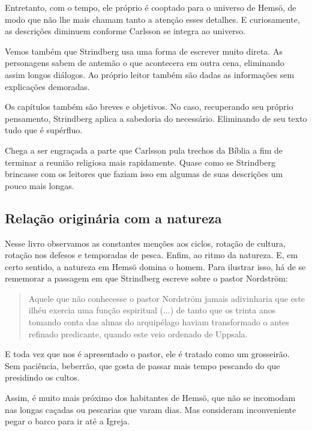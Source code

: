 \documentclass[12pt]{extarticle}
\begin{document}
Entretanto, com o tempo, ele próprio é cooptado para o universo de
Hemsö, de modo que não lhe mais chamam tanto a atenção esses detalhes. E
curiosamente, as descrições diminuem conforme Carlsson se integra ao
universo.

Vemos também que Strindberg usa uma forma de escrever muito direta. As
personagens sabem de antemão o que acontecera em outra cena, eliminando
assim longos diálogos. Ao próprio leitor também são dadas as informações
sem explicações demoradas.

Os capítulos também são breves e objetivos. No caso, recuperando seu
próprio pensamento, Strindberg aplica a sabedoria do necessário.
Eliminando de seu texto tudo que é supérfluo.

Chega a ser engraçada a parte que Carlsson pula trechos da Bíblia a fim
de terminar a reunião religiosa mais rapidamente. Quase como se
Strindberg brincasse com os leitores que faziam isso em algumas de suas
descrições um pouco mais longas.

\subsection{Relação originária com a natureza}

Nesse livro observamos as constantes menções aos ciclos, rotação de
cultura, rotação nos defesos e temporadas de pesca. Enfim, ao ritmo da
natureza. E, em certo sentido, a natureza em Hemsö domina o homem. Para
ilustrar isso, há de se rememorar a passagem em que Strindberg escreve
sobre o pastor Nordström:

\begin{quote}
Aquele que não conhecesse o pastor Nordström jamais adivinharia que este
ilhéu exercia uma função espiritual (...) de tanto que os trinta anos
tomando conta das almas do arquipélago haviam transformado o antes
refinado predicante, quando este veio ordenado de Uppsala.
\end{quote}

E toda vez que nos é apresentado o pastor, ele é tratado como um
grosseirão. Sem paciência, beberrão, que gosta de passar mais tempo
pescando do que presidindo os cultos.

Assim, é muito mais próximo dos habitantes de Hemsö, que não se
incomodam nas longas caçadas ou pescarias que varam dias. Mas consideram
inconveniente pegar o barco para ir até a Igreja.
\end{document}
